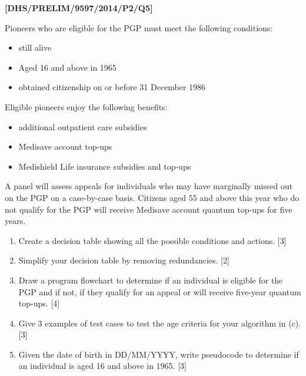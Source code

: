 \item \textbf{{[}DHS/PRELIM/9597/2014/P2/Q5{]} }

Pioneers who are eligible for the PGP must meet the following conditions: 
\begin{itemize}
\item still alive 
\item Aged 16 and above in 1965 
\item obtained citizenship on or before 31 December 1986 
\end{itemize}
Eligible pioneers enjoy the following benefits: 
\begin{itemize}
\item additional outpatient care subsidies 
\item Medisave account top-ups 
\item Medishield Life insurance subsidies and top-ups 
\end{itemize}
A panel will assess appeals for individuals who may have marginally
missed out on the PGP on a case-by-case basis. Citizens aged 55 and
above this year who do not qualify for the PGP will receive Medisave
account quantum top-ups for five years. 
\begin{enumerate}
\item Create a decision table showing all the possible conditions and actions.
\hfill{}{[}3{]}
\item Simplify your decision table by removing redundancies. \hfill{}{[}2{]}
\item Draw a program flowchart to determine if an individual is eligible
for the PGP and if not, if they qualify for an appeal or will receive
five-year quantum top-ups. \hfill{}{[}4{]}
\item Give 3 examples of test cases to test the age criteria for your algorithm
in (c). \hfill{}{[}3{]}
\item Given the date of birth in DD/MM/YYYY, write pseudocode to determine
if an individual is aged 16 and above in 1965. \hfill{}{[}3{]}
\end{enumerate}